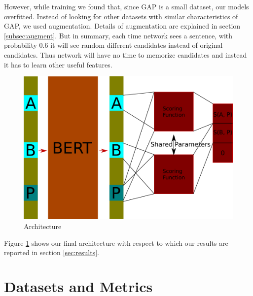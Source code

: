 \documentclass[11pt,a4paper]{article}
\begin{document}
However, while training we found that, since GAP is a small dataset, our models overfitted. Instead of looking for other datasets with similar characteristics of GAP, we used augmentation. Details of augmentation are explained in section \ref{subsec:augment}. But in summary, each time network sees a sentence, with probability 0.6 it will see random different candidates instead of original candidates. Thus network will have no time to memorize candidates and instead it has to learn other useful features.



\begin{figure}
  \centering
  \includegraphics[width=.4\textwidth]{arch.png}
  \caption{Architecture}
  \label{fig:arch}
\end{figure}

Figure \ref{fig:arch} shows our final architecture with respect to which our results are reported in section \ref{sec:results}.
\section{Datasets and Metrics}
\end{document}
